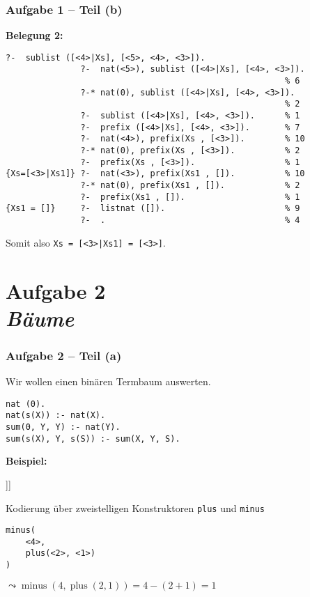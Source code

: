 \documentclass{beamer}
\begin{document}
\begin{frame}[fragile] \frametitle{Aufgabe 1 -- Teil (b)}
	\footnotesize
	\textbf{Belegung 2:}
	
	\begin{lstlisting}[style=refutation, basicstyle=\ttfamily\scriptsize]
               ?-  sublist ([<4>|Xs], [<5>, <4>, <3>]).
               ?-  nat(<5>), sublist ([<4>|Xs], [<4>, <3>]). 
                                                        % 6
               ?-* nat(0), sublist ([<4>|Xs], [<4>, <3>]).  
                                                        % 2
               ?-  sublist ([<4>|Xs], [<4>, <3>]).      % 1
               ?-  prefix ([<4>|Xs], [<4>, <3>]).       % 7
               ?-  nat(<4>), prefix(Xs , [<3>]).        % 10
               ?-* nat(0), prefix(Xs , [<3>]).          % 2
               ?-  prefix(Xs , [<3>]).                  % 1
{Xs=[<3>|Xs1]} ?-  nat(<3>), prefix(Xs1 , []).          % 10
               ?-* nat(0), prefix(Xs1 , []).            % 2
               ?-  prefix(Xs1 , []).                    % 1
{Xs1 = []}     ?-  listnat ([]).                        % 9
               ?-  .                                    % 4
	\end{lstlisting}
	
	Somit also \texttt{Xs = [<3>|Xs1] = [<3>]}.
\end{frame}



\section{Aufgabe 2 \\ \itshape \normalsize Bäume}

\begin{frame}[fragile] \frametitle{Aufgabe 2 -- Teil (a)}
	\footnotesize
	Wir wollen einen binären Termbaum auswerten. 
	\begin{lstlisting}
nat (0).
nat(s(X)) :- nat(X).
sum(0, Y, Y) :- nat(Y).
sum(s(X), Y, s(S)) :- sum(X, Y, S).
	\end{lstlisting}

	\textbf{Beispiel:} 
	
	\begin{minipage}{\dimexpr0.35\linewidth-\fboxrule-\fboxsep}		
		\begin{forest}
			[\texttt{minus} [\texttt{<4>}] [\texttt{plus} [\texttt{<2>}] [\texttt{<1>}]]]
		\end{forest}
	\end{minipage}
	\begin{minipage}{\dimexpr0.65\linewidth-\fboxrule-\fboxsep}
		Kodierung über zweistelligen Konstruktoren \texttt{plus} und \texttt{minus} 
		\begin{lstlisting}[style=refutation]
minus( 
	<4>,
	plus(<2>, <1>)
)
		\end{lstlisting}
	\end{minipage}

	$\leadsto \operatorname{minus}(4, \operatorname{plus}(2,1)) = 4 - (2 + 1) = 1$
	
\end{frame}
\end{document}
